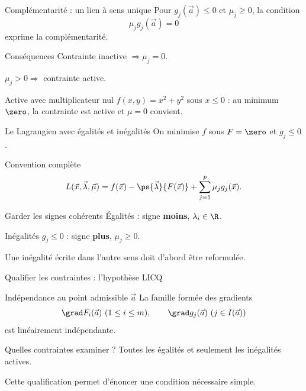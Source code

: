\begin{frame}[t]{Complémentarité : un lien à sens unique}
\coursanalyse
Pour $g_j(\vec a)\le0$ et $\mu_j\ge0$, la condition
\[\mu_jg_j(\vec a)=0\]
exprime la complémentarité.
\begin{cours}{Conséquences}
Contrainte inactive $\Longrightarrow\mu_j=0$.
\medskip\par $\mu_j>0\Longrightarrow$ contrainte active.
\end{cours}
\begin{exemple}{Active avec multiplicateur nul}
$f(x,y)=x^2+y^2$ sous $x\le0$ : au minimum $\zero$, la contrainte est active et $\mu=0$ convient.
\end{exemple}
\end{frame}

\begin{frame}[t]{Le Lagrangien avec égalités et inégalités}
\coursanalyse
On minimise $f$ sous $F=\zero$ et $g_j\le0$.
\begin{notion}{Convention complète}
\[L(\vec x,\vec\lambda,\vec\mu)=f(\vec x)-\ps{\vec\lambda}{F(\vec x)}+\sum_{j=1}^p\mu_jg_j(\vec x).\]
\end{notion}
\begin{cours}{Garder les signes cohérents}
Égalités : signe \textbf{moins}, $\lambda_i\in\R$.
\medskip\par Inégalités $g_j\le0$ : signe \textbf{plus}, $\mu_j\ge0$.
\end{cours}\vfill Une inégalité écrite dans l’autre sens doit d’abord être reformulée.
\end{frame}

\begin{frame}[t]{Qualifier les contraintes : l’hypothèse LICQ}
\coursanalyse
\begin{notion}{Indépendance au point admissible $\vec a$}
La famille formée des gradients
\[\grad F_i(\vec a)\ (1\le i\le m),\qquad\grad g_j(\vec a)\ (j\in I(\vec a))\]
est linéairement indépendante.
\end{notion}
\begin{resultat}{Quelles contraintes examiner ?}
Toutes les égalités et seulement les inégalités actives.
\end{resultat}\vfill Cette qualification permet d’énoncer une condition nécessaire simple.
\end{frame}

